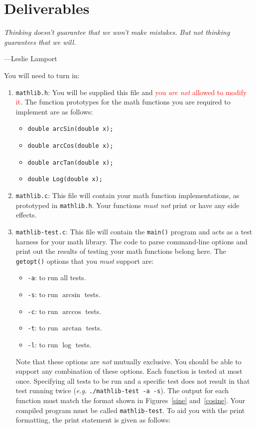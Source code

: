 \documentclass[11pt]{article}
\begin{document}
\section{Deliverables}

\textwidth
\epigraph{\emph{Thinking doesn't guarantee that we won't make mistakes. But
not thinking guarantees that we will.}}{---Leslie Lamport}

\noindent You will need to turn in:
\begin{enumerate}
  \item \texttt{mathlib.h}: You will be supplied this file and \textcolor{red}{you \emph{are not} allowed
    to modify it}. The function prototypes for the math functions you are
    required to implement are as follows:
    \begin{itemize}
      \item \texttt{double arcSin(double x);}
      \item \texttt{double arcCos(double x);}
      \item \texttt{double arcTan(double x);}
      \item \texttt{double Log(double x);}
    \end{itemize}

  \item \texttt{mathlib.c}: This file will contain your math function
    implementations, as prototyped in \texttt{mathlib.h}. Your functions
    \emph{must not} print or have any side effects.

  \item \texttt{mathlib-test.c}: This file will contain the \texttt{main()}
    program and acts as a test harness for your math library. The code to parse
    command-line options and print out the results of testing your math
    functions belong here. The \texttt{getopt()} options that you \emph{must}
    support are:
    \begin{itemize}
      \item \texttt{-a}: to run all tests.
      \item \texttt{-s}: to run $\arcsin$ tests.
      \item \texttt{-c}: to run $\arccos$ tests.
      \item \texttt{-t}: to run $\arctan$ tests.
      \item \texttt{-l}: to run $\log$ tests.
    \end{itemize}
    Note that these options are \emph{not} mutually exclusive. You should be
    able to support any combination of these options. Each function is tested at
    most once. Specifying all tests to be run and a specific test does not
    result in that test running twice (\textit{e.g.}\xspace
    \texttt{./mathlib-test -a -s}). The output for each function must
    match the format shown in Figures~\ref{sine}
    and~\ref{cosine}. Your compiled program must be called
    \texttt{mathlib-test}. To aid you with the print formatting, the print
    statement is given as follows:


\end{enumerate}
\end{document}
